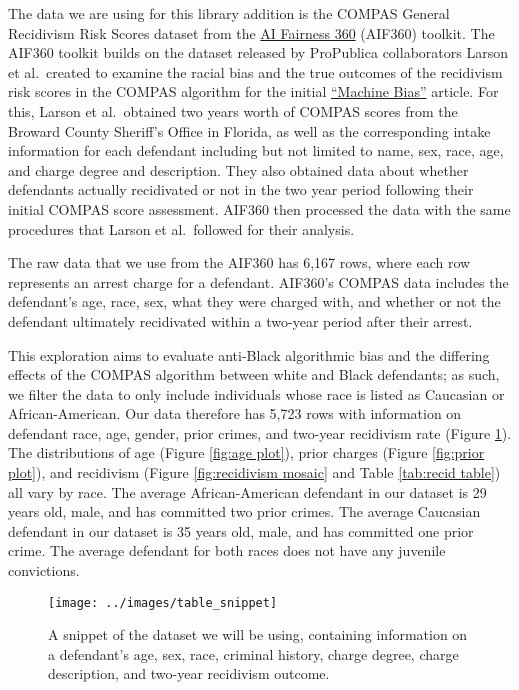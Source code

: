 \documentclass[,article,,moreauthors,pdftex]{mdpi}
\begin{document}
The data we are using for this library addition is the COMPAS General
Recidivism Risk Scores dataset from the
\href{https://aif360.readthedocs.io/en/stable/modules/generated/aif360.datasets.CompasDataset.html\#aif360.datasets.CompasDataset}{AI
Fairness 360} (AIF360) toolkit. The AIF360 toolkit builds on the dataset
released by ProPublica collaborators Larson et al.~created to examine
the racial bias and the true outcomes of the recidivism risk scores in
the COMPAS algorithm for the initial
\href{https://www.propublica.org/article/machine-bias-risk-assessments-in-criminal-sentencing}{``Machine
Bias''} article. For this, Larson et al.~obtained two years worth of
COMPAS scores from the Broward County Sheriff's Office in Florida, as
well as the corresponding intake information for each defendant
including but not limited to name, sex, race, age, and charge degree and
description. They also obtained data about whether defendants actually
recidivated or not in the two year period following their initial COMPAS
score assessment. AIF360 then processed the data with the same
procedures that Larson et al.~followed for their analysis.

The raw data that we use from the AIF360 has 6,167 rows, where each row
represents an arrest charge for a defendant. AIF360's COMPAS data
includes the defendant's age, race, sex, what they were charged with,
and whether or not the defendant ultimately recidivated within a
two-year period after their arrest.

This exploration aims to evaluate anti-Black algorithmic bias and the
differing effects of the COMPAS algorithm between white and Black
defendants; as such, we filter the data to only include individuals
whose race is listed as Caucasian or African-American. Our data
therefore has 5,723 rows with information on defendant race, age,
gender, prior crimes, and two-year recidivism rate (Figure
\ref{fig:table snip}). The distributions of age (Figure
\ref{fig:age plot}), prior charges (Figure \ref{fig:prior plot}), and
recidivism (Figure \ref{fig:recidivism mosaic} and Table
\ref{tab:recid table}) all vary by race. The average African-American
defendant in our dataset is 29 years old, male, and has committed two
prior crimes. The average Caucasian defendant in our dataset is 35 years
old, male, and has committed one prior crime. The average defendant for
both races does not have any juvenile convictions.

\begin{figure}

{\centering \texttt{[image: ../images/table\_snippet]} 

}

\caption{A snippet of the dataset we will be using, containing information on a defendant's age, sex, race, criminal history, charge degree, charge description, and two-year recidivism outcome.}\label{fig:table snip}
\end{figure}
\end{document}
